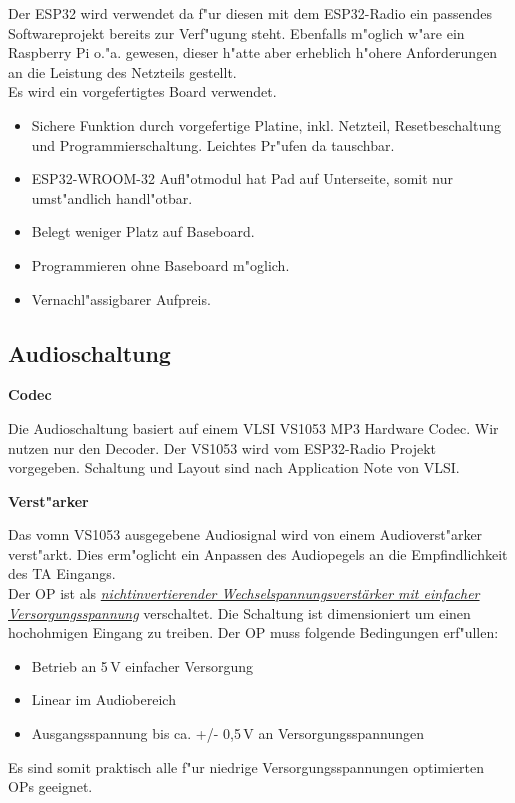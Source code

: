 \documentclass[ngerman,11pt,parskip=half] {scrartcl}
\begin{document}
Der ESP32 wird verwendet da f"ur diesen mit dem ESP32-Radio ein passendes Softwareprojekt bereits zur Verf"ugung steht. Ebenfalls m"oglich w"are ein Raspberry Pi o."a. gewesen, dieser h"atte aber erheblich h"ohere Anforderungen an die Leistung des Netzteils gestellt.\\

Es wird ein vorgefertigtes Board verwendet.
\begin{itemize}
\item Sichere Funktion durch vorgefertige Platine, inkl. Netzteil, Resetbeschaltung und Programmierschaltung. Leichtes Pr"ufen da tauschbar.
\item ESP32-WROOM-32 Aufl"otmodul hat Pad auf Unterseite, somit nur umst"andlich handl"otbar.
\item Belegt weniger Platz auf Baseboard.
\item Programmieren ohne Baseboard m"oglich.
\item Vernachl"assigbarer Aufpreis.
\end{itemize}

\subsection{Audioschaltung} \label{sec:schaltung:audio}

\textbf{Codec}

Die Audioschaltung basiert auf einem VLSI VS1053 MP3 Hardware Codec. Wir nutzen nur den Decoder. Der VS1053 wird vom ESP32-Radio Projekt vorgegeben. Schaltung und Layout sind nach Application Note von VLSI.

\textbf{Verst"arker}

Das vomn VS1053 ausgegebene Audiosignal wird von einem Audioverst"arker verst"arkt. Dies erm"oglicht ein Anpassen des Audiopegels an die Empfindlichkeit des TA Eingangs. \\
Der OP ist als \emph{\href{https://www.mikrocontroller.net/articles/Operationsverst\%C3\%A4rker-Grundschaltungen\#Betrieb\_mit\_einfacher\_Versorgungsspannung}{nichtinvertierender Wechselspannungsverstärker mit einfacher Versorgungsspannung}} verschaltet. Die Schaltung ist dimensioniert um einen hochohmigen Eingang zu treiben. Der OP muss folgende Bedingungen erf"ullen:
\begin{itemize}
\item Betrieb an 5\,V einfacher Versorgung
\item Linear im Audiobereich
\item Ausgangsspannung bis ca. +/- 0,5\,V an Versorgungsspannungen
\end{itemize}
Es sind somit praktisch alle f"ur niedrige Versorgungsspannungen optimierten OPs geeignet.
\end{document}
